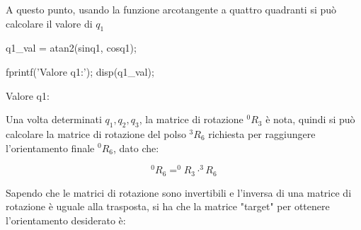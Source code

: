 \documentclass[11pt, a4paper]{article}
\begin{document}
\begin{par}
\begin{flushleft}
A questo punto, usando la funzione arcotangente a quattro quadranti si può calcolare il valore di $q_1$
\end{flushleft}
\end{par}

\begin{matlabcode}
q1_val = atan2(sinq1, cosq1);

fprintf('Valore q1:');
disp(q1_val);
\end{matlabcode}
\begin{matlaboutput}
Valore q1:
\end{matlaboutput}
\begin{matlabsymbolicoutput}
\end{matlabsymbolicoutput}


\begin{par}
\begin{flushleft}
Una volta determinati $q_1 ,q_2 ,q_3$, la matrice di rotazione $^0 R_3$ è nota, quindi si può calcolare la matrice di rotazione del polso $^3 R_6$ richiesta per raggiungere l'orientamento finale $^0 R_6$, dato che:
\end{flushleft}
\end{par}

\[
    ^0 R_6 =^0 R_3 \cdot ^3 R_6
\]

\begin{par}
\begin{flushleft}
Sapendo che le matrici di rotazione sono invertibili e l'inversa di una matrice di rotazione è uguale alla trasposta, si ha che la matrice "target" per ottenere l'orientamento desiderato è:
\end{flushleft}
\end{par}
\end{document}
